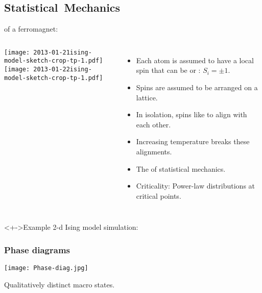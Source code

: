 \subsection{Statistical\ Mechanics}


\begin{frame}

  \begin{block}{ of a ferromagnet:}
    \begin{columns}
      \texttt{[image: 2013-01-21ising-model-sketch-crop-tp-1.pdf]}\\
      \texttt{[image: 2013-01-22ising-model-sketch-crop-tp-1.pdf]}
      \begin{itemize}
      \item<+-> 
        Each atom is assumed to have a local spin 
        that can be  or : $ S_i = \pm 1$.
      \item<+-> 
        Spins are assumed to be arranged on a lattice.
      \item<+-> 
        In isolation, spins like to align with each other.
      \item<+-> 
        Increasing temperature breaks these alignments.
      \item<+-> 
        The  of statistical mechanics.
      \item<+-> 
        Criticality: Power-law distributions at critical points.
      \end{itemize}
    \end{columns}
  \end{block}
  \begin{block}<+->{Example 2-d Ising model simulation:}
  \end{block}

\end{frame}


\begin{frame}
  \frametitle{Phase diagrams}

  \texttt{[image: Phase-diag.jpg]}

  \medskip

  Qualitatively distinct macro states.

\end{frame}

